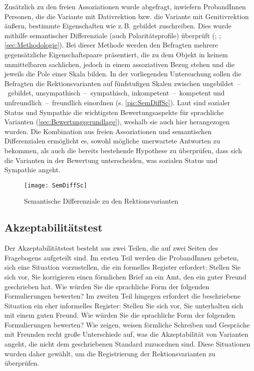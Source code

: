 Zusätzlich zu den freien Assoziationen wurde abgefragt, inwiefern ProbandInnen Personen, die die Variante mit Dativrektion bzw. die Variante mit Genitivrektion äußern, bestimmte Eigenschaften wie z.\,B. \glq gebildet\grq{} zuschreiben. Dies wurde mithilfe semantischer Differenziale (auch Polaritätsprofile) überprüft (\citealp[s.][1255]{Garrett2005}; \citealp[234]{Atteslander2010}; \autoref{sec:Methodologie}). Bei dieser Methode werden den Befragten mehrere gegensätzliche Eigenschaftspaare präsentiert, die \glqq zu dem Objekt in keinem unmittelbaren sachlichen, jedoch in einem assoziativen Bezug\grqq{} \citep[234]{Atteslander2010} stehen  und die jeweils die Pole einer Skala bilden. In der vorliegenden Untersuchung sollen die Befragten die Rektionsvarianten auf fünfstufigen Skalen zwischen ungebildet~--~gebildet, unsympathisch~--~sympathisch, inkompetent~--~kompetent und unfreundlich~--~freundlich einordnen (s. \autoref{pic:SemDiffSc}). 
Laut \citet[49]{Preston2004} sind sozialer Status und Sympathie die wichtigsten Bewertungsaspekte für sprachliche Varianten (\autoref{sec:Bewertungsgrundlage}), weshalb sie auch hier herangezogen wurden. Die Kombination aus freien Assoziationen und semantischen Differenzialen ermöglicht es, sowohl mögliche unerwartete Antworten zu bekommen, als auch die bereits bestehende Hypothese zu überprüfen, dass sich die Varianten in der Bewertung unterscheiden, was sozialen Status und Sympathie angeht.  

\begin{figure}
\centering
\texttt{[image: SemDiffSc]}
\caption{Semantische Differenziale zu den Rektionsvarianten}
\label{pic:SemDiffSc}
\end{figure}

\subsection{Akzeptabilitätstest} 
\label{sec:Akz}
Der Akzeptabilitätstest besteht aus zwei Teilen, die auf zwei Seiten des Fragebogens aufgeteilt sind. 
Im ersten Teil werden die ProbandInnen gebeten, sich eine Situation vorzustellen, die ein formelles Register erfordert: \glqq Stellen Sie sich vor, Sie korrigieren einen förmlichen Brief an ein Amt, den ein guter Freund geschrieben hat. 
Wie würden Sie die sprachliche Form der folgenden Formulierungen bewerten?\grqq{} Im zweiten Teil hingegen erfordert die beschriebene Situation ein eher informelles Register: \glqq Stellen Sie sich vor, Sie unterhalten sich mit einem guten Freund. 
Wie würden Sie die sprachliche Form der folgenden Formulierungen bewerten?\grqq{} 
Wie \citet[182]{Koplenig.2016} zeigen, weisen förmliche Schreiben und Gespräche mit Freunden recht große Unterschiede auf, was die Akzeptabilität von Varianten angeht, die nicht dem geschriebenen Standard zuzuordnen sind. 
Diese Situationen wurden daher gewählt, um die Registrierung der Rektionsvarianten zu überprüfen.

